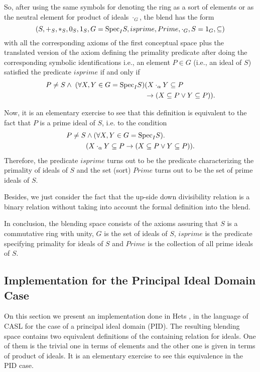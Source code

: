 So, after using the same symbols for denoting the ring as a sort of
elements or as the neutral element for product of ideals $\cdot_G$,
the blend has the form
%
\[(S, +_S, *_S, 0_S, 1_S, G={\rm Spec}_IS, isprime, Prime, \cdot_G, S=1_G, \subseteq)\]
with all the corresponding axioms of the first conceptual space plus the translated version of the axiom defining the primality predicate after doing the corresponding symbolic identifications i.e., an element $P \in G$ (i.e., an ideal of $S$) satisfied the predicate $isprime$ if and only if 
\begin{align*}
  P\neq S \wedge\; (\forall X,Y\in G={\rm Spec}_IS) & (X\cdot_{\alpha}Y\subseteq P \\
                  & \rightarrow (X\subseteq P \vee Y\subseteq P)).
\end{align*}

Now, it is an elementary exercise to see that this definition is equivalent to the fact that $P$ is a prime ideal of $S$, i.e. to the condition
\begin{align*}
P\neq S & \wedge (\forall X,Y\in G={\rm Spec}_IS). \\
        & (X\cdot_{\alpha}Y\subseteq P \rightarrow (X\subseteq P \vee Y\subseteq P)).
\end{align*}
Therefore, the predicate $isprime$ turns out to be the predicate characterizing the primality of ideals of $S$ and the set (sort) $Prime$ turns out to be the set of prime ideals of $S$.

Besides, we just consider the fact that the up-side down divisibility relation is a binary relation without taking into account the formal definition into the blend. 


In conclusion, the blending space consists of the axioms assuring that $S$ is a commutative ring with unity, $G$ is the set of ideals of $S$, $isprime$ is the predicate specifying primality for ideals of $S$ and $Prime$ is the collection of all prime ideals of $S$. 
 
\subsection{Implementation for the Principal Ideal Domain Case}

On this section we present an implementation done in
Hets \parencite{Mossakowskihets}, in the language of CASL for the case
of a principal ideal domain (PID).  The resulting blending space
contains two equivalent definitions of the containing relation for
ideals. One of them is the trivial one in terms of elements and the
other one is given in terms of product of ideals. It is an elementary
exercise to see this equivalence in the PID case.

